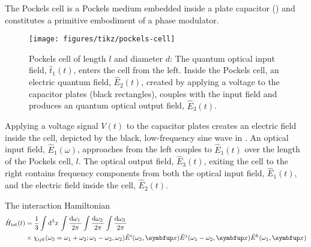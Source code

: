 The Pockels cell is a Pockels medium embedded inside a plate capacitor () and constitutes a primitive embodiment of a phase modulator.
\begin{figure}[htb]
    \centering
    \texttt{[image: figures/tikz/pockels-cell]}
    \caption{Pockels cell of length $l$ and diameter $d$: The quantum optical input field, $\hat{t}_1(t)$, enters the cell from the left. Inside the Pockels cell, an electric quantum field, $\hat{E}_2(t)$, created by applying a voltage to the capacitor plates (black rectangles), couples with the input field and produces an quantum optical output field, $\hat{E}_3(t)$.}\label{fig:pockels_cell}
\end{figure}
Applying a voltage signal $V(t)$ to the capacitor plates creates an electric field inside the cell, depicted by the black, low-frequency sine wave in .
An optical input field, $\hat{E}_1(\omega)$, approaches from the left couples to $\hat{E}_1(t)$ over the length of the Pockels cell, $l$.
The optical output field, $\hat{E}_3(t)$, exiting the cell to the right contains frequency components from both the optical input field, $\hat{E}_1(t)$, and the electric field inside the cell, $\hat{E}_2(t)$.



The interaction Hamiltonian~\cite[p.~1070]{Mandel1995}
\begin{equation}
	\begin{split}
		\hat{H}_\text{int}(t)
		&=
		\frac{1}{3}
		\int\dd[3]{x}
		\int\frac{\dd{\omega_1}}{2\pi}
		\int\frac{\dd{\omega_2}}{2\pi}
		\int\frac{\dd{\omega_3}}{2\pi}
		\\
		&\times
		\chi_{ijk}(\omega_3=\omega_1+\omega_2;\omega_1-\omega_2,\omega_2)
		\hat{E}^i(\omega_3,\vb{x})
		\hat{E}^j(\omega_1-\omega_2,\vb{x})
		\hat{E}^k(\omega_1,\vb{x})
	\end{split}
\end{equation}

